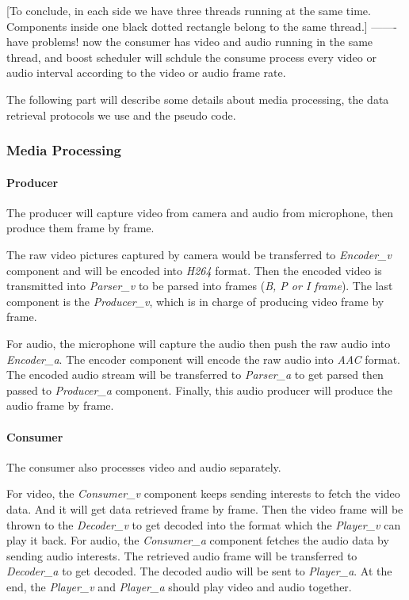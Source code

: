 [To conclude, in each side we have three threads running at the same time. Components inside one black dotted rectangle belong to the same thread.] ------- have problems! now the consumer has video and audio running in the same thread, and boost scheduler will schdule the consume process every video or audio interval according to the video or audio frame rate. 

The following part will describe some details about media processing, the data retrieval protocols we use and the pseudo code.
\subsubsection {Media Processing}
\paragraph {Producer}
The producer will capture video from camera and audio from microphone, then produce them frame by frame.

The raw video pictures captured by camera would be transferred to \textit{Encoder\_v} component and will be encoded into \textit{H264} format. Then the encoded video is transmitted into \textit{Parser\_v} to be parsed into frames (\textit{B, P or I frame}). The last component is the \textit{Producer\_v}, which is in charge of producing video frame by frame.

For audio, the microphone will capture the audio then push the raw audio into \textit{Encoder\_a}. The encoder component will encode the raw audio into \textit{AAC} format. The encoded audio stream will be transferred to \textit{Parser\_a} to get parsed then passed to \textit{Producer\_a} component. Finally, this audio producer will produce the audio frame by frame.

\paragraph {Consumer}
The consumer also processes video and audio separately.

For video, the \textit{Consumer\_v} component keeps sending interests to fetch the video data. And it will get data retrieved frame by frame. Then the video frame will be thrown to the \textit{Decoder\_v} to get decoded into the format which the \textit{Player\_v} can play it back.
For audio, the \textit{Consumer\_a} component fetches the audio data by sending audio interests. The retrieved audio frame will be transferred to \textit{Decoder\_a} to get decoded. The decoded audio will be sent to \textit{Player\_a}. At the end, the \textit{Player\_v} and \textit{Player\_a} should play video and audio together.

